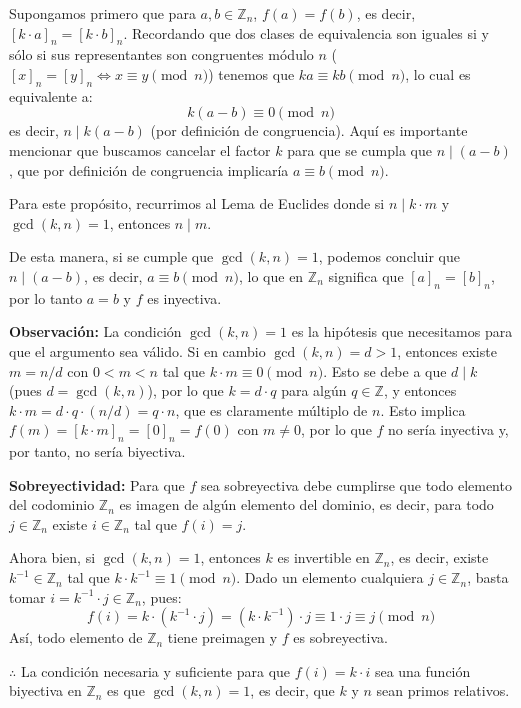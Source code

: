 \documentclass[12pt, a4paper]{article}
\begin{document}
\begin{enumerate}
Supongamos primero que para $a,b \in \mathbb{Z}_n$, $f(a)=f(b)$, es decir, $[k \cdot a]_n = [k \cdot b]_n$.
Recordando que dos clases de equivalencia son iguales si y sólo si sus representantes son congruentes
módulo $n$ ($[x]_n = [y]_n \iff x \equiv y \pmod{n}$) tenemos que $ka \equiv kb \pmod{n}$, lo cual
es equivalente a:
\[
k(a - b) \equiv 0 \pmod{n}
\]
es decir, $n \mid k(a-b)$ (por definición de congruencia). Aquí es importante mencionar que buscamos cancelar el 
factor $k$ para que se cumpla que $n \mid (a-b)$, que por definición de congruencia implicaría $a \equiv b \pmod{n}$.

Para este propósito, recurrimos al Lema de Euclides donde si $n \mid k \cdot m$ y $\gcd(k,n)=1$, entonces $n \mid m$.

De esta manera, si se cumple que $\gcd(k,n)=1$, podemos concluir que $n \mid (a-b)$, es decir, $a \equiv b \pmod{n}$, 
lo que en $\mathbb{Z}_n$ significa que $[a]_n = [b]_n$, por lo tanto $a = b$ y $f$ es inyectiva.

\textbf{Observación:} La condición $\gcd(k,n)=1$ es la hipótesis que necesitamos para que el argumento sea válido.
Si en cambio $\gcd(k, n) = d > 1$, entonces existe $m = n/d$ con $0 < m < n$ tal que $k \cdot m \equiv 0 \pmod{n}$.
Esto se debe a que $d \mid k$ (pues $d = \gcd(k,n)$), por lo que $k = d \cdot q$ para algún $q \in \mathbb{Z}$, y entonces
$k \cdot m = d \cdot q \cdot (n/d) = q \cdot n$, que es claramente múltiplo de $n$. Esto implica $f(m) = [k \cdot m]_n = [0]_n = f(0)$
con $m \neq 0$, por lo que $f$ no sería inyectiva y, por tanto, no sería biyectiva.

\textbf{Sobreyectividad:} Para que $f$ sea sobreyectiva debe cumplirse que todo elemento del codominio
$\mathbb{Z}_n$ es imagen de algún elemento del dominio, es decir, para todo $j \in \mathbb{Z}_n$
existe $i \in \mathbb{Z}_n$ tal que $f(i) = j$.

Ahora bien, si $\gcd(k, n) = 1$, entonces $k$ es invertible en $\mathbb{Z}_n$, es decir, existe
$k^{-1} \in \mathbb{Z}_n$ tal que $k \cdot k^{-1} \equiv 1 \pmod{n}$. Dado un elemento cualquiera
$j \in \mathbb{Z}_n$, basta tomar $i = k^{-1} \cdot j \in \mathbb{Z}_n$, pues:
\[
f(i) = k \cdot (k^{-1} \cdot j) = (k \cdot k^{-1}) \cdot j \equiv 1 \cdot j \equiv j \pmod{n}
\]
Así, todo elemento de $\mathbb{Z}_n$ tiene preimagen y $f$ es sobreyectiva.

$\therefore$ La condición necesaria y suficiente para que $f(i)=k \cdot i$ sea una función
biyectiva en $\mathbb{Z}_n$ es que $\gcd(k, n) = 1$, es decir, que $k$ y $n$ sean primos relativos.



\end{enumerate}
\end{document}
